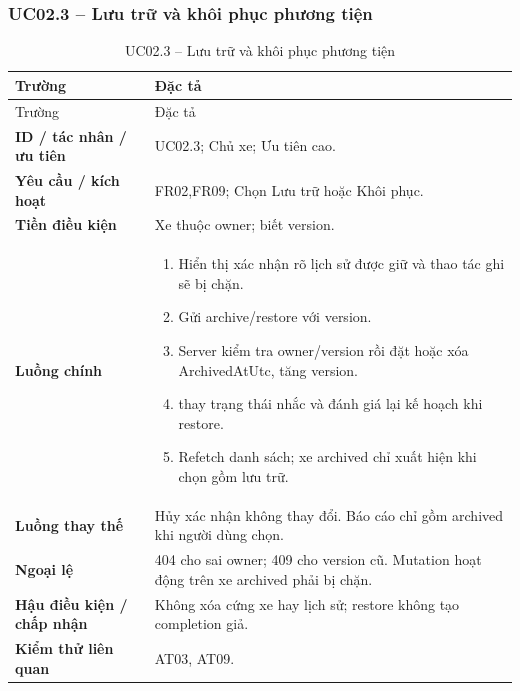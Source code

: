 \subsubsection{UC02.3 -- Lưu trữ và khôi phục phương tiện}\label{uc:UC02.3}
\begin{smalltable}\begin{longtable}{L{3.2cm}L{11.8cm}}
\caption{UC02.3 -- Lưu trữ và khôi phục phương tiện}\label{tab:UC02.3}\\
\toprule Trường & Đặc tả\\\midrule\endfirsthead
\toprule Trường & Đặc tả\\\midrule\endhead
\textbf{ID / tác nhân / ưu tiên} & UC02.3; Chủ xe; Ưu tiên cao.\\
\textbf{Yêu cầu / kích hoạt} & FR02,FR09; Chọn Lưu trữ hoặc Khôi phục.\\
\textbf{Tiền điều kiện} & Xe thuộc owner; biết version.\\
\textbf{Luồng chính} & \begin{enumerate}[leftmargin=*,nosep]
\item Hiển thị xác nhận rõ lịch sử được giữ và thao tác ghi sẽ bị chặn.
\item Gửi archive/restore với version.
\item Server kiểm tra owner/version rồi đặt hoặc xóa ArchivedAtUtc, tăng version.
\item thay trạng thái nhắc và đánh giá lại kế hoạch khi restore.
\item Refetch danh sách; xe archived chỉ xuất hiện khi chọn gồm lưu trữ.
\end{enumerate}\\
\textbf{Luồng thay thế} & Hủy xác nhận không thay đổi. Báo cáo chỉ gồm archived khi người dùng chọn.\\
\textbf{Ngoại lệ} & 404 cho sai owner; 409 cho version cũ. Mutation hoạt động trên xe archived phải bị chặn.\\
\textbf{Hậu điều kiện / chấp nhận} & Không xóa cứng xe hay lịch sử; restore không tạo completion giả.\\
\textbf{Kiểm thử liên quan} & AT03, AT09.\\
\bottomrule\end{longtable}\end{smalltable}
